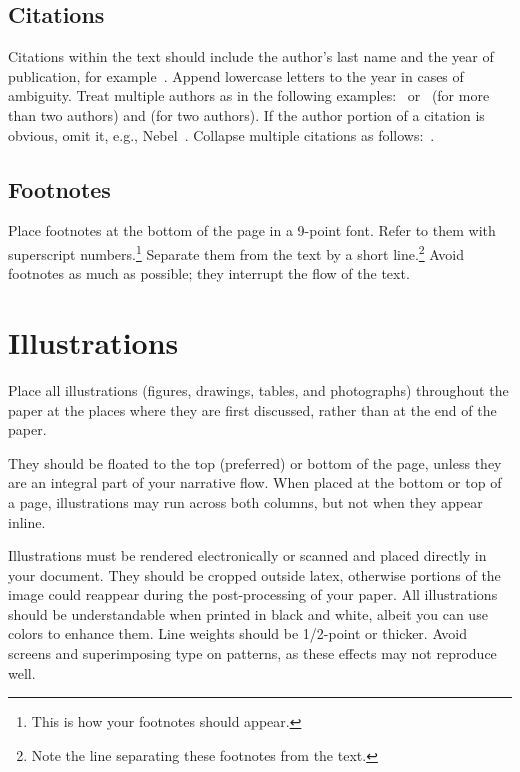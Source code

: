 \documentclass{article}
\begin{document}
\subsection{Citations}

Citations within the text should include the author's last name and
the year of publication, for example~\cite{gottlob:nonmon}.  Append
lowercase letters to the year in cases of ambiguity.  Treat multiple
authors as in the following examples:~\cite{abelson-et-al:scheme}
or~\cite{bgf:Lixto} (for more than two authors) and
\cite{brachman-schmolze:kl-one} (for two authors).  If the author
portion of a citation is obvious, omit it, e.g.,
Nebel~.  Collapse multiple citations as
follows:~\cite{gls:hypertrees,levesque:functional-foundations}.
\nocite{abelson-et-al:scheme}
\nocite{bgf:Lixto}
\nocite{brachman-schmolze:kl-one}
\nocite{gottlob:nonmon}
\nocite{gls:hypertrees}
\nocite{levesque:functional-foundations}
\nocite{levesque:belief}
\nocite{nebel:jair-2000}

\subsection{Footnotes}

Place footnotes at the bottom of the page in a 9-point font.  Refer to
them with superscript numbers.\footnote{This is how your footnotes
should appear.} Separate them from the text by a short
line.\footnote{Note the line separating these footnotes from the
text.} Avoid footnotes as much as possible; they interrupt the flow of
the text.

\section{Illustrations}

Place all illustrations (figures, drawings, tables, and photographs)
throughout the paper at the places where they are first discussed,
rather than at the end of the paper.

They should be floated to the top (preferred) or bottom of the page,
unless they are an integral part
of your narrative flow. When placed at the bottom or top of
a page, illustrations may run across both columns, but not when they
appear inline.

Illustrations must be rendered electronically or scanned and placed
directly in your document. They should be cropped outside latex, otherwise portions of the image could reappear during the post-processing of your paper. All illustrations should be understandable when printed in black and
white, albeit you can use colors to enhance them. Line weights should
be 1/2-point or thicker. Avoid screens and superimposing type on
patterns, as these effects may not reproduce well.
\end{document}
